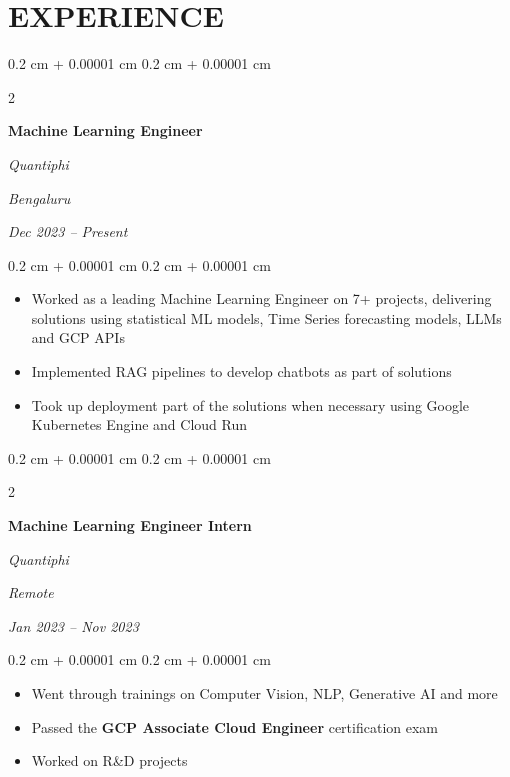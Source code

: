 \documentclass[10pt, letterpaper]{article}
\newenvironment{highlights}{
    \begin{itemize}[
        topsep=0.10 cm,
        parsep=0.10 cm,
        partopsep=0pt,
        itemsep=0pt,
        leftmargin=0.4 cm + 10pt
    ]
}{
    \end{itemize}
} %
\newenvironment{onecolentry}{
    \begin{adjustwidth}{
        0.2 cm + 0.00001 cm
    }{
        0.2 cm + 0.00001 cm
    }
}{
    \end{adjustwidth}
} %
\newenvironment{twocolentry}[2][]{
    \onecolentry
    \def\secondColumn{#2}
    \setcolumnwidth{\fill, 4.5 cm}
    \begin{paracol}{2}
}{
    \switchcolumn \raggedleft \secondColumn
    \end{paracol}
    \endonecolentry
} %
\begin{document}
    
    \section{EXPERIENCE}
        \begin{twocolentry}{
        \textit{Bengaluru}    
            
        \textit{Dec 2023 – Present}}
            \textbf{Machine Learning Engineer}
            
            \textit{Quantiphi}
        \end{twocolentry}

        \vspace{0.10 cm}
        \begin{onecolentry}
            \begin{highlights}
                \item Worked as a leading Machine Learning Engineer on 7+ projects, delivering solutions using statistical ML models, Time Series forecasting models, LLMs and GCP APIs
                \item Implemented RAG pipelines to develop chatbots as part of solutions
                \item Took up deployment part of the solutions when necessary using Google Kubernetes Engine and Cloud Run
            \end{highlights}
        \end{onecolentry}

        \vspace{0.2 cm}

        \begin{twocolentry}{
        \textit{Remote}    
            
        \textit{Jan 2023 – Nov 2023}}
            \textbf{Machine Learning Engineer Intern}
            
            \textit{Quantiphi}
        \end{twocolentry}

        \vspace{0.10 cm}
        \begin{onecolentry}
            \begin{highlights}
                \item Went through trainings on Computer Vision, NLP, Generative AI and more
                \item Passed the \textbf{GCP Associate Cloud Engineer} certification exam
                \item Worked on R\&D projects
            \end{highlights}
        \end{onecolentry}
\end{document}
